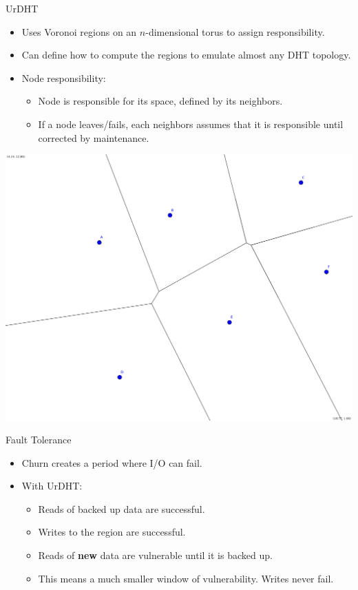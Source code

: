 \documentclass[11pt]{beamer}
\begin{document}
\begin{frame}{UrDHT}
	\begin{itemize}
		\item Uses Voronoi regions on an $n$-dimensional torus to assign responsibility.
		\item Can define how to compute the regions to emulate almost any DHT topology.
		\item Node responsibility:
		\begin{itemize}
			\item Node is responsible for its space, defined by its neighbors.
			\item If a node leaves/fails, each neighbors assumes that it is responsible until corrected by maintenance. 
		\end{itemize}
	\end{itemize}
	
\begin{center}
\includegraphics[width=0.5\linewidth]{figs/new_voronoi}
\end{center}


\end{frame}

\begin{frame}{Fault Tolerance}
	\begin{itemize}
		\item Churn creates a period where I/O can fail.  
		\item With UrDHT:
		\begin{itemize}
			\item Reads of backed up data are successful.
			\item Writes to the region are successful. 
			\item Reads of \textbf{new} data are vulnerable until it is backed up.
			\item This means a much smaller window of vulnerability.  Writes never fail.%
		\end{itemize}
	\end{itemize}

\end{frame}
\end{document}
